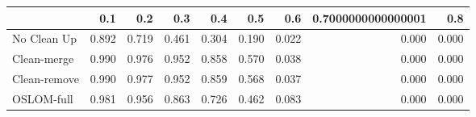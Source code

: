 \begin{tabular}{lrrrrrrrr}
\toprule
{} &   0.1 &   0.2 &   0.3 &   0.4 &   0.5 &   0.6 & 0.7000000000000001 &   0.8 \\
\midrule
No Clean Up  & 0.892 & 0.719 & 0.461 & 0.304 & 0.190 & 0.022 &              0.000 & 0.000 \\
Clean-merge  & 0.990 & 0.976 & 0.952 & 0.858 & 0.570 & 0.038 &              0.000 & 0.000 \\
Clean-remove & 0.990 & 0.977 & 0.952 & 0.859 & 0.568 & 0.037 &              0.000 & 0.000 \\
OSLOM-full   & 0.981 & 0.956 & 0.863 & 0.726 & 0.462 & 0.083 &              0.000 & 0.000 \\
\bottomrule
\end{tabular}
